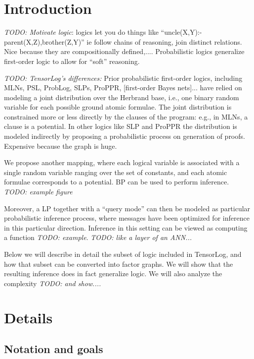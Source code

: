 \documentclass[12pt]{article}
\newcommand{\yy}[1]{\textit{TODO: {#1}}}
\begin{document}
 

\section{Introduction}

\yy{Motivate logic}: logics let you do things like
``uncle(X,Y):-parent(X,Z),brother(Z,Y)'' ie follow chains of
reasoning, join distinct relations. Nice because they are
compositionally defined,....  Probabilistic logics generalize
first-order logic to allow for ``soft'' reasoning.

\yy{TensorLog's differences:} Prior probabilistic first-order logics,
including MLNs, PSL, ProbLog, SLPs, ProPPR, [first-order Bayes
  nets]... have relied on modeling a joint distribution over the
Herbrand base, i.e., one binary random variable for each possible
ground atomic formulae.  The joint distribution is constrained more or
less directly by the clauses of the program: e.g., in MLNs, a clause
is a potential. In other logics like SLP and ProPPR the distribution
is modeled indirectly by proposing a probabilistic process on
generation of proofs.  Expensive because the graph is huge.

We propose another mapping, where each logical variable is associated
with a single random variable ranging over the set of constants, and
each atomic formulae corresponds to a potential.  BP can be used to
perform inference. \yy{example figure} 

Moreover, a LP together with a ``query mode'' can then be modeled as
particular probabilistic inference process, where messages have been
optimized for inference in this particular direction.  Inference in
this setting can be viewed as computing a function \yy{example}.
\yy{like a layer of an ANN...}

Below we will describe in detail the subset of logic included in
TensorLog, and how that subset can be converted into factor graphs.
We will show that the resulting inference does in fact generalize
logic.  We will also analyze the complexity \yy{and show....}

\section{Details}

\subsection{Notation and goals}
\end{document}
